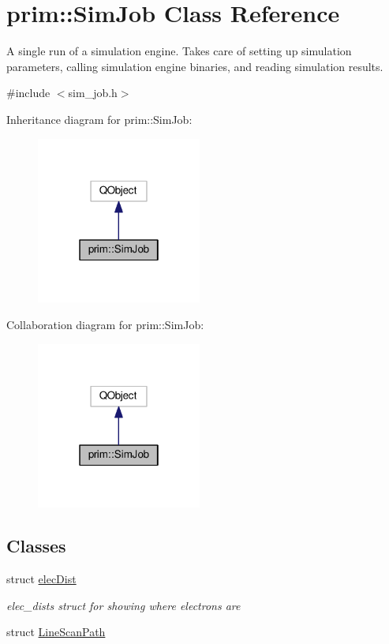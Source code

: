 \hypertarget{classprim_1_1SimJob}{}\section{prim\+:\+:Sim\+Job Class Reference}
\label{classprim_1_1SimJob}


A single run of a simulation engine. Takes care of setting up simulation parameters, calling simulation engine binaries, and reading simulation results.  




{\ttfamily \#include $<$sim\+\_\+job.\+h$>$}



Inheritance diagram for prim\+:\+:Sim\+Job\+:\nopagebreak
\begin{figure}[H]
\begin{center}
\leavevmode
\includegraphics[width=154pt]{classprim_1_1SimJob__inherit__graph}
\end{center}
\end{figure}


Collaboration diagram for prim\+:\+:Sim\+Job\+:\nopagebreak
\begin{figure}[H]
\begin{center}
\leavevmode
\includegraphics[width=154pt]{classprim_1_1SimJob__coll__graph}
\end{center}
\end{figure}
\subsection*{Classes}
\begin{DoxyCompactItemize}
\item 
struct \hyperlink{structprim_1_1SimJob_1_1elecDist}{elec\+Dist}
\begin{DoxyCompactList}\small\item\em elec\+\_\+dists struct for showing where electrons are \end{DoxyCompactList}\item 
struct \hyperlink{structprim_1_1SimJob_1_1LineScanPath}{Line\+Scan\+Path}
\end{DoxyCompactItemize}
